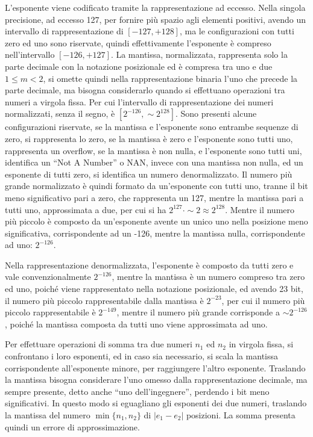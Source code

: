 \documentclass{article}
\numberwithin{equation}{subsection}
\begin{document}
L'esponente viene codificato tramite la rappresentazione ad eccesso. Nella singola precisione, ad eccesso 127, per fornire più spazio agli elementi positivi, avendo un intervallo di rappresentazione di $[-127, +128]$, 
ma le configurazioni con tutti zero ed uno sono riservate, quindi effettivamente l'esponente è compreso nell'intervallo $[-126, +127]$. 
La mantissa, normalizzata, rappresenta solo la parte decimale con la notazione posizionale ed è compresa tra uno e due $1\leq m<2$, si omette quindi nella rappresentazione binaria l'uno che precede la parte decimale, 
ma bisogna considerarlo quando si effettuano operazioni tra numeri a virgola fissa. 
Per cui l'intervallo di rappresentazione dei numeri normalizzati, senza il segno, è $[2^{-126}, \sim2^{128}]$. Sono presenti alcune configurazioni riservate, se la mantissa e l'esponente sono entrambe sequenze di zero, 
si rappresenta lo zero, se la mantissa è zero e l'esponente sono tutti uno, rappresenta un overflow, se la mantissa è non nulla, e l'esponente sono tutti uni, identifica un ``Not A Number'' o NAN, invece 
con una mantissa non nulla, ed un esponente di tutti zero, si identifica un numero denormalizzato. 
Il numero più grande normalizzato è quindi formato da un'esponente con tutti uno, tranne il bit meno significativo pari a zero, che rappresenta un 127, mentre la mantissa pari a tutti uno, approssimata a due, 
per cui si ha $2^{127}\cdot\sim2\approx2^{128}$. Mentre il numero più piccolo è composto da un'esponente avente un unico uno nella posizione meno significativa, corrispondente ad un -126, mentre la mantissa nulla, 
corrispondente ad uno: $2^{-126}$. 

Nella rappresentazione denormalizzata, l'esponente è composto da tutti zero e vale convenzionalmente $2^{-126}$, mentre la mantissa è un numero compreso tra zero ed uno, poiché viene rappresentato nella notazione 
posizionale, ed avendo 23 bit, il numero più piccolo rappresentabile dalla mantissa è $2^{-23}$, per cui il numero più piccolo rappresentabile è $2^{-149}$, mentre il numero più grande corrisponde a $\sim2^{-126}$, 
poiché la mantissa composta da tutti uno viene approssimata ad uno. 


Per effettuare operazioni di somma tra due numeri $n_1$ ed $n_2$ in virgola fissa, si confrontano i loro esponenti, ed in caso sia necessario, si scala la mantissa corrispondente all'esponente minore, per raggiungere 
l'altro esponente. Traslando la mantissa bisogna considerare l'uno omesso dalla rappresentazione decimale, ma sempre presente, detto anche ``uno dell'ingegnere'', perdendo i bit meno significativi. In questo modo 
si eguagliano gli esponenti dei due numeri, traslando la mantissa del numero $\min\{n_1,n_2\}$ di $|e_1-e_2|$ posizioni. La somma presenta quindi un errore di approssimazione. 
\end{document}
